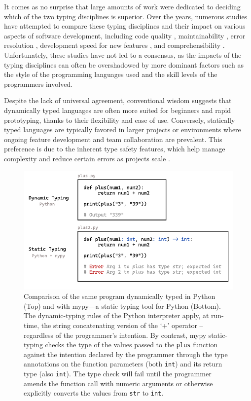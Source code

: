 It comes as no surprise that large amounts of work were dedicated to deciding which of the two typing disciplines is superior. Over the years, numerous studies have attempted to compare these typing disciplines and their impact on various aspects of software development, including code quality \cite{Ray2017-gq, Gao2017-xn}, maintainability \cite{Kleinschmager2012-bg}, error resolution \cite{Prechelt1998-pd}, development speed for new features \cite{Prechelt2000-bf, Mayer2012-ko}, and comprehensibility \cite{Endrikat2014-uz}. Unfortunately, these studies have not led to a consensus, as the impacts of the typing disciplines can often be overshadowed by more dominant factors such as the style of the programming languages used and the skill levels of the programmers involved.

Despite the lack of universal agreement, conventional wisdom suggests that dynamically typed languages are often more suited for beginners and rapid prototyping, thanks to their flexibility and ease of use. Conversely, statically typed languages are typically favored in larger projects or environments where ongoing feature development and team collaboration are prevalent. This preference is due to the inherent type safety features, which help manage complexity and reduce certain errors as projects scale \cite{Chatley2019-uq}.


\begin{figure}[ht]
  \centering
  \includegraphics[width=\linewidth]{TypedVsUntyped.pdf}
  \caption[Comparison of the same program dynamically typed in Python and with mypy—a static typing tool for Python]{
    \label{fig:typed-vs-untyped}
    Comparison of the same program dynamically typed in Python (Top) and with mypy—a static typing tool for Python (Bottom).  The dynamic-typing rules of the Python interpreter apply, at run-time, the string concatenating version of the `+' operator -- regardless of the programmer's intention.  By contrast, mypy static-typing checks the type of the values passed to the {\tt plus} function against the intention declared by the programmer through the type annotations on the function parameters (both {\tt int}) and its return type (also {\tt int}).  The type check will fail until the programmer amends the function call with numeric arguments or otherwise explicitly converts the values from {\tt str} to {\tt int}.
    }
\end{figure}



